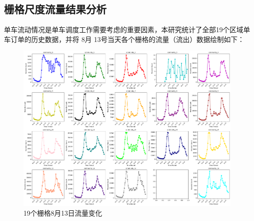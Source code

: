 \documentclass[12pt,a4paper,oneside]{ctexart}
\begin{document}
\subsection{栅格尺度流量结果分析}
单车流动情况是单车调度工作需要考虑的重要因素，本研究统计了全部19个区域单车订单的历史数据，并将 8月 13号当天各个栅格的流量（流出）数据绘制如下：
\begin{figure}[H]
    \centering
    \includegraphics[width=1\textwidth]{Figs/局部流量变化分析.png}
    \caption{19个栅格8月13日流量变化}
    \label{fig:grid}
\end{figure}
\end{document}

